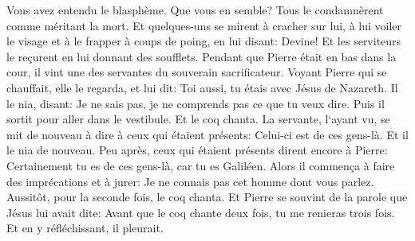 \verse Vous avez entendu le blasphème. Que vous en semble? Tous le condamnèrent comme méritant la mort. 
\verse Et quelques-uns se mirent à cracher sur lui, à lui voiler le visage et à le frapper à coups de poing, en lui disant: Devine! Et les serviteurs le reçurent en lui donnant des soufflets. 
\verse Pendant que Pierre était en bas dans la cour, il vint une des servantes du souverain sacrificateur. 
\verse Voyant Pierre qui se chauffait, elle le regarda, et lui dit: Toi aussi, tu étais avec Jésus de Nazareth. 
\verse Il le nia, disant: Je ne sais pas, je ne comprends pas ce que tu veux dire. Puis il sortit pour aller dans le vestibule. Et le coq chanta. 
\verse La servante, l`ayant vu, se mit de nouveau à dire à ceux qui étaient présents: Celui-ci est de ces gens-là. Et il le nia de nouveau. 
\verse Peu après, ceux qui étaient présents dirent encore à Pierre: Certainement tu es de ces gens-là, car tu es Galiléen. 
\verse Alors il commença à faire des imprécations et à jurer: Je ne connais pas cet homme dont vous parlez. 
\verse Aussitôt, pour la seconde fois, le coq chanta. Et Pierre se souvint de la parole que Jésus lui avait dite: Avant que le coq chante deux fois, tu me renieras trois fois. Et en y réfléchissant, il pleurait. 

